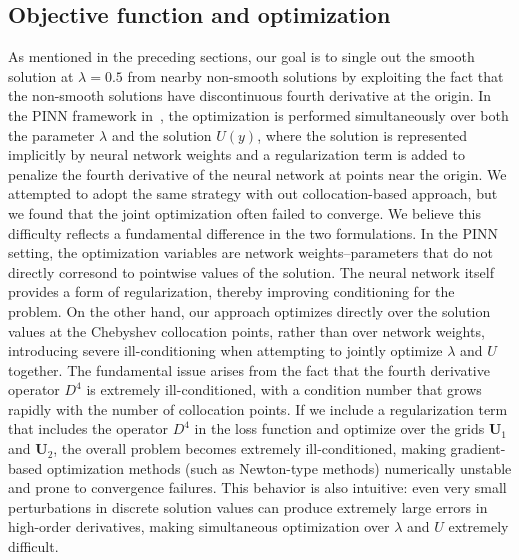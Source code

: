 \documentclass[12pt]{article}
\theoremstyle{definition}\newtheorem{lemma}{Lemma}
\begin{document}
\subsection{Objective function and optimization}\label{subsec:inference_optimization}
As mentioned in the preceding sections, our goal is to single out the smooth solution at $\lambda = 0.5$ from nearby non-smooth solutions by exploiting the fact that the non-smooth solutions have discontinuous fourth derivative at the origin.
In the PINN framework in~\cite{wang2023asymptotic}, the optimization is performed simultaneously over both the parameter $\lambda$ and the solution $U(y)$, where the solution is represented implicitly by neural network weights and a regularization term is added to penalize the fourth derivative of the neural network at points near the origin. We attempted to adopt the same strategy with out collocation-based approach, but we found that the joint optimization often failed to converge. We believe this difficulty reflects a fundamental difference in the two formulations. In the PINN setting, the optimization variables are network weights--parameters that do not directly corresond to pointwise values of the solution. The neural network itself provides a form of regularization, thereby improving conditioning for the problem. On the other hand, our approach optimizes directly over the solution values at the Chebyshev collocation points, rather than over network weights, introducing severe ill-conditioning when attempting to jointly optimize $\lambda$ and $U$ together. The fundamental issue arises from the fact that the fourth derivative operator $D^4$ is extremely ill-conditioned, with a condition number that grows rapidly with the number of collocation points. If we include a regularization term that includes the operator $D^4$ in the loss function and optimize over the grids $\mathbf{U}_1$ and $\mathbf{U}_2$, the overall problem becomes extremely ill-conditioned, making gradient-based optimization methods (such as Newton-type methods) numerically unstable and prone to convergence failures. This behavior is also intuitive: even very small perturbations in discrete solution values can produce extremely large errors in high-order derivatives, making simultaneous optimization over $\lambda$ and $U$ extremely difficult.
\end{document}
